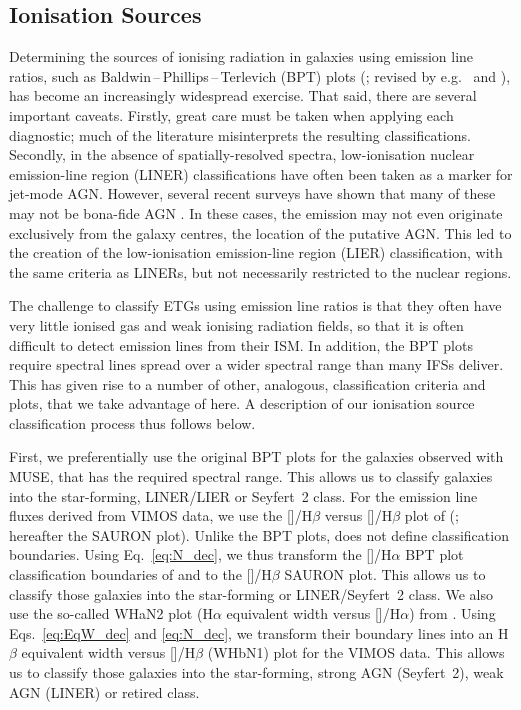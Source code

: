 \documentclass[a4paper,fleqn,usenatbib]{mnras}
\begin{document}
\subsection{Ionisation Sources}
\label{subsec:Diagnostics}

Determining the sources of ionising radiation in galaxies using
emission line ratios, such as Baldwin\,--\,Phillips\,--\,Terlevich
(BPT) plots (\citealt{Baldwin1981}; revised by e.g.\
\citealt{Kewley2001, Kewley2006} and \citealt{Kauffmann2003a}), has
become an increasingly widespread exercise. That said, there are
several important caveats. Firstly, great care must be taken when
applying each diagnostic; much of the literature misinterprets the
resulting classifications. Secondly, in the absence of
spatially-resolved spectra, low-ionisation nuclear emission-line
region (LINER) classifications have often been taken as a marker for
jet-mode AGN. However, several recent surveys have shown that many of
these may not be bona-fide AGN \citep[e.g.][]{Sarzi2005, Sarzi2010,
  Singh2013, Belfiore2016a}. In these cases, the emission may not even
originate exclusively from the galaxy centres, the location of the
putative AGN. This led to the creation of the low-ionisation
emission-line region (LIER) classification, with the same criteria as
LINERs, but not necessarily restricted to the nuclear regions.

The challenge to classify ETGs using emission line ratios is that they
often have very little ionised gas and weak ionising radiation fields,
so that it is often difficult to detect emission lines from their
ISM. In addition, the BPT plots require spectral lines spread over a
wider spectral range than many IFSs deliver. This has given rise to a
number of other, analogous, classification criteria and plots, that we
take advantage of here. A description of our ionisation source
classification process thus follows below.

First, we preferentially use the original BPT plots for the galaxies
observed with MUSE, that has the required spectral range. This allows
us to classify galaxies into the star-forming, LINER/LIER or Seyfert~2
class. For the emission line fluxes derived from VIMOS data, we use
the [\ion{N}{i}]/H$\beta$ versus [\ion{O}{iii}]/H$\beta$ plot of
\citeauthor{Sarzi2010} (\citeyear{Sarzi2010}; hereafter the SAURON
plot). Unlike the BPT plots, \citet{Sarzi2010} does not define
classification boundaries. Using Eq.~\ref{eq:N_dec}, we thus transform
the [\ion{N}{ii}]/H$\alpha$ BPT plot classification boundaries of
\citet{Kewley2001} and \citet{Kauffmann2003a} to the
[]/H$\beta$ SAURON plot. This allows us to classify those
galaxies into the star-forming or LINER/Seyfert~2 class. We also use
the so-called WHaN2 plot (H$\alpha$ equivalent width versus
[]/H$\alpha$) from \citet{CidFernandes2011}. Using
Eqs.~\ref{eq:EqW_dec} and \ref{eq:N_dec}, we transform their boundary
lines into an H$\beta$ equivalent width versus [\ion{N}{i}]/H$\beta$
(WHbN1) plot for the VIMOS data. This allows us to classify those
galaxies into the star-forming, strong AGN (Seyfert~2), weak AGN
(LINER) or retired class.
\end{document}
